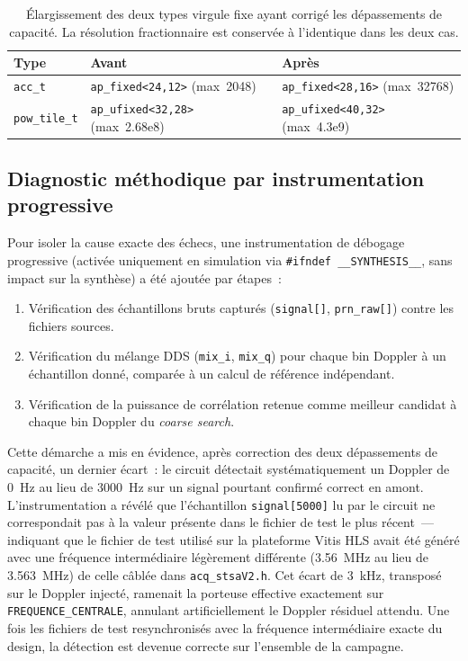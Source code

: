 \documentclass[11pt,a4paper]{article}
\begin{document}
\begin{table}[H]
\centering
\renewcommand{\arraystretch}{1.3}
\begin{tabular}{lll}
\toprule
\textbf{Type} & \textbf{Avant} & \textbf{Après} \\
\midrule
\texttt{acc\_t}      & \texttt{ap\_fixed<24,12>} (max~2048)  & \texttt{ap\_fixed<28,16>} (max~32768) \\
\texttt{pow\_tile\_t} & \texttt{ap\_ufixed<32,28>} (max~2.68e8) & \texttt{ap\_ufixed<40,32>} (max~4.3e9) \\
\bottomrule
\end{tabular}
\caption{Élargissement des deux types virgule fixe ayant corrigé les dépassements de capacité. La résolution fractionnaire est conservée à l'identique dans les deux cas.}
\end{table}

\subsection{Diagnostic méthodique par instrumentation progressive}

Pour isoler la cause exacte des échecs, une instrumentation de débogage progressive (activée uniquement en simulation via \texttt{\#ifndef \_\_SYNTHESIS\_\_}, sans impact sur la synthèse) a été ajoutée par étapes~:
\begin{enumerate}
  \item Vérification des échantillons bruts capturés (\texttt{signal[]}, \texttt{prn\_raw[]}) contre les fichiers sources.
  \item Vérification du mélange DDS (\texttt{mix\_i}, \texttt{mix\_q}) pour chaque bin Doppler à un échantillon donné, comparée à un calcul de référence indépendant.
  \item Vérification de la puissance de corrélation retenue comme meilleur candidat à chaque bin Doppler du \textit{coarse search}.
\end{enumerate}

Cette démarche a mis en évidence, après correction des deux dépassements de capacité, un dernier écart~: le circuit détectait systématiquement un Doppler de 0~Hz au lieu de 3000~Hz sur un signal pourtant confirmé correct en amont. L'instrumentation a révélé que l'échantillon \texttt{signal[5000]} lu par le circuit ne correspondait pas à la valeur présente dans le fichier de test le plus récent~--- indiquant que le fichier de test utilisé sur la plateforme Vitis HLS avait été généré avec une fréquence intermédiaire légèrement différente (3.56~MHz au lieu de 3.563~MHz) de celle câblée dans \texttt{acq\_stsaV2.h}. Cet écart de 3~kHz, transposé sur le Doppler injecté, ramenait la porteuse effective exactement sur \texttt{FREQUENCE\_CENTRALE}, annulant artificiellement le Doppler résiduel attendu. Une fois les fichiers de test resynchronisés avec la fréquence intermédiaire exacte du design, la détection est devenue correcte sur l'ensemble de la campagne.
\end{document}
